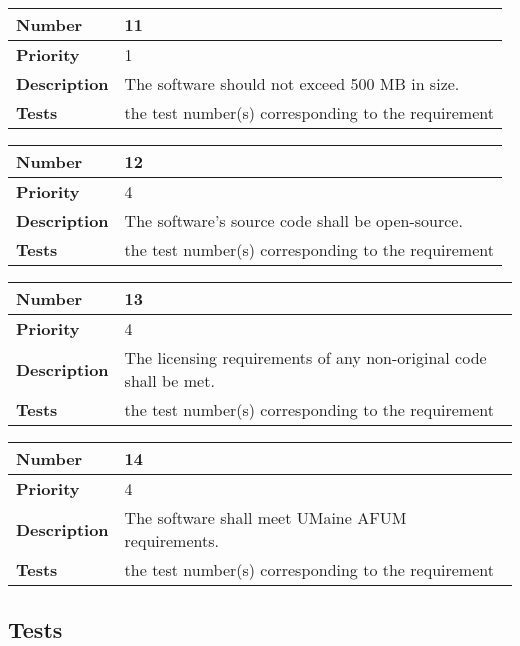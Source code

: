 \documentclass{article}
\begin{document}
\begin{center}
\bigskip
{}
\begin{tabular}{|p{3.5cm}|p{7.5cm}|} 
\hline
\textbf{Number} & 11  \\
\hline
\textbf{Priority} & 1 \\ 
\hline
\textbf{Description} & The software should not exceed 500 MB in size. \\ 
\hline
\textbf{Tests }& the test number(s) corresponding to the requirement \\ 
\hline
\end{tabular}


\bigskip
{}
\begin{tabular}{|p{3.5cm}|p{7.5cm}|} 
\hline
\textbf{Number} & 12  \\
\hline
\textbf{Priority} & 4\\ 
\hline
\textbf{Description} & The software's source code shall be open-source. \\ 
\hline
\textbf{Tests }& the test number(s) corresponding to the requirement \\ 
\hline
\end{tabular}


\bigskip
{}
\begin{tabular}{|p{3.5cm}|p{7.5cm}|} 
\hline
\textbf{Number} & 13  \\
\hline
\textbf{Priority} & 4 \\ 
\hline
\textbf{Description} & The licensing requirements of any non-original code shall be met.\\ 
\hline
\textbf{Tests }& the test number(s) corresponding to the requirement \\ 
\hline
\end{tabular}

\bigskip
\vspace{.5in}
\begin{tabular}{|p{3.5cm}|p{7.5cm}|} 
\hline
\textbf{Number} & 14  \\
\hline
\textbf{Priority} & 4 \\ 
\hline
\textbf{Description} & The software shall meet UMaine AFUM requirements.\\ 
\hline
\textbf{Tests }& the test number(s) corresponding to the requirement \\ 
\hline
\end{tabular}

\end{center}

\subsection{Tests}
\end{document}
